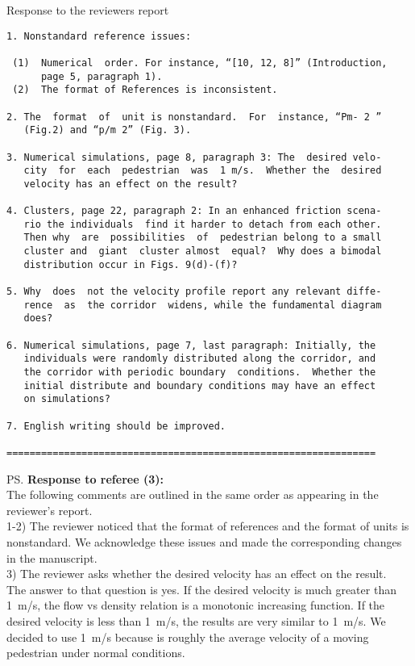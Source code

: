 \documentclass[a4paper,12pt]{letter}
\begin{document}
\begin{letter}{Response to the reviewers report}
\begin{verbatim}
1. Nonstandard reference issues:

 (1)  Numerical  order. For instance, “[10, 12, 8]” (Introduction,
      page 5, paragraph 1).
 (2)  The format of References is inconsistent.

2. The  format  of  unit is nonstandard.  For  instance, “Pm- 2 ”
   (Fig.2) and “p/m 2” (Fig. 3).

3. Numerical simulations, page 8, paragraph 3: The  desired velo-
   city  for  each  pedestrian  was  1 m/s.  Whether the  desired 
   velocity has an effect on the result?

4. Clusters, page 22, paragraph 2: In an enhanced friction scena-
   rio the individuals  find it harder to detach from each other.
   Then why  are  possibilities  of  pedestrian belong to a small 
   cluster and  giant  cluster almost  equal?  Why does a bimodal
   distribution occur in Figs. 9(d)-(f)?

5. Why  does  not the velocity profile report any relevant diffe-
   rence  as  the corridor  widens, while the fundamental diagram
   does?

6. Numerical simulations, page 7, last paragraph: Initially, the 
   individuals were randomly distributed along the corridor, and 
   the corridor with periodic boundary  conditions.  Whether the 
   initial distribute and boundary conditions may have an effect 
   on simulations?

7. English writing should be improved.

================================================================

\end{verbatim}


\ps{\textbf{Response to referee (3):} \\

The following comments are outlined in the same order as appearing in the
reviewer’s report. \\

1-2) The reviewer noticed that the format of references and the format of units is nonstandard. We acknowledge these issues and made the corresponding changes in the manuscript.\\

3) The reviewer asks whether the desired velocity has an effect on the result.\\

The answer to that question is yes. If the desired velocity is much greater than 1~m/s, the flow vs density relation is a monotonic increasing function. If the desired velocity is less than 1~m/s, the results are very similar to 1~m/s. We decided to use 1~m/s because is roughly the average velocity of a moving pedestrian under normal conditions. \\

}
\end{letter}
\end{document}
